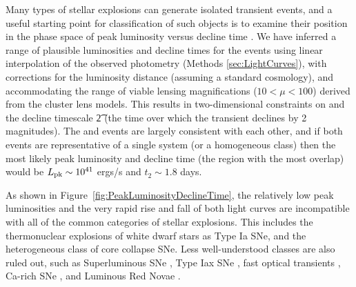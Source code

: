 Many types of stellar explosions can generate isolated
transient events, and a useful starting point for classification of
such objects is to examine their position in the phase
space of peak luminosity versus decline time \citep[see,
  e.g.,][]{Kulkarni:2007}. We have inferred a range of plausible
luminosities and decline times for the \spock events using linear
interpolation of the observed photometry (Methods
\ref{sec:LightCurves}), with corrections for the luminosity distance
(assuming a standard \LCDM cosmology), and accommodating the range of
viable lensing magnifications ($10<\mu<100$) derived from the cluster
lens models. This results in two-dimensional constraints on \Lpk and
the decline timescale \t2 (the time over which the transient declines
by 2 magnitudes). The \spockone and \spocktwo events are largely
consistent with each other, and if both events are representative of a
single system (or a homogeneous class) then the most likely peak
luminosity and decline time (the region with the most overlap) would
be $L_{\rm pk}\sim10^{41}$ ergs/s and $t_2\sim1.8$ days.

As shown in Figure~\ref{fig:PeakLuminosityDeclineTime}, the relatively
low peak luminosities and the very rapid rise and fall of both \spock
light curves are incompatible with all of the common categories of
stellar explosions. This includes the thermonuclear explosions of
white dwarf stars as Type Ia SNe, and the heterogeneous class of
core collapse SNe.  Less well-understood classes are also
ruled out, such as Superluminous SNe \citep{Gal-Yam:2012,Arcavi:2016},
Type Iax SNe \citep{Foley:2013a}, fast optical transients
\citep{Drout:2014}, Ca-rich SNe
\citep{Filippenko:2003,Perets:2011,Kasliwal:2012}, and Luminous Red
Novae \citep[also called intermediate luminosity red
  transients;][]{Munari:2002,Kulkarni:2007,Kasliwal:2011b}.

